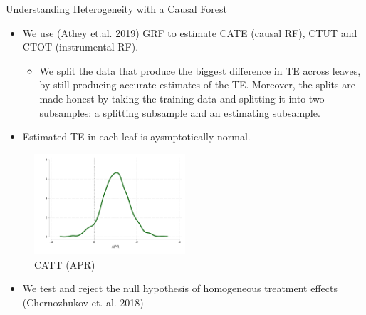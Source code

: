\documentclass[8pt]{beamer}
\begin{document}
\begin{frame}{Understanding Heterogeneity with a Causal Forest}
\label{HTE}
\begin{itemize}

\item We use (Athey et.al. 2019) GRF to estimate CATE (causal RF), CTUT and CTOT (instrumental RF).

\begin{itemize}	
	\item We split the data that produce the biggest difference in TE across leaves, by still producing accurate estimates of the TE. Moreover, the splits are made honest by taking the training data and splitting it into two subsamples: a splitting subsample and an estimating subsample. \hyperlink{honest_causal_tree}{}   
\end{itemize}

\item Estimated TE in each leaf is aysmptotically normal. 
\end{itemize}


    \begin{figure}
        \caption{CATT (APR)}
        \centering
        \includegraphics[width=0.5\textwidth]{Figuras/he_dist_tau_hat_tut.pdf}
        \end{figure}

 \begin{itemize}
\item We test and reject the null hypothesis of homogeneous treatment effects (Chernozhukov et. al. 2018)
 \end{itemize}       
\end{frame}
\end{document}

